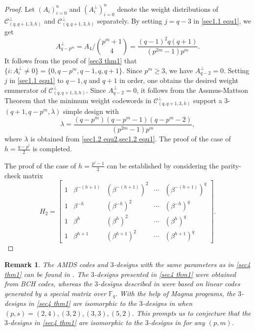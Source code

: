 \documentclass[sn-mathphys-num]{sn-jnl}%
\theoremstyle{thmstyleone}%
\theoremstyle{thmstyletwo}%
\newtheorem{remark}{Remark}%
\theoremstyle{thmstylethree}%
\begin{document}
\begin{proof}
	Let $(A_i)_{i=0}^n$ and $(A^\perp_i)_{i=0}^n$ denote the weight distributions of $\mathcal{C}^\perp_{(q,q+1,3,h)}$ and $\mathcal{C}^\perp_{(q,q+1,3,h)}$ separately. By setting $j=q-3$ in \cref{sec1.1 equ1}, we get
	\begin{equation*}
		A^\perp_{q-p^m}=A_4\bigg/\binom{p^m+1}{4}=\frac{(q-1)^2q(q+1)}{(p^{2m}-1)p^{m}}.
	\end{equation*}
	It follows from the proof of \cref{sec3 thm1} that $\{i : A^\perp_i \ne 0\}=\{0,q-p^m,q-1,q,q+1\}$. Since $p^m \ge 3$, we have $A^\perp_{q-2}=0$. Setting $j$ in \cref{sec1.1 equ1} to $q-1,q$ and $q+1$ in order, one obtains the desired weight enumerator of $\mathcal{C}^\perp_{(q,q+1,3,h)}$. Since $A^\perp_{q-2}=0$, it follows from the Assmus-Mattson Theorem that the minimum weight codewords in $\mathcal{C}^\perp_{(q,q+1,3,h)}$ support a $3$-$(q+1,q-p^m,\lambda)$ simple design with
	\begin{equation*}
		\lambda=\frac{(q-p^m)(q-p^m-1)(q-p^m-2)}{(p^{2m}-1)p^{m}},
	\end{equation*}
	where $\lambda$ is obtained from \cref{sec1.2 equ2,sec1.2 equ1}. The proof of the case of $h=\frac{q-p^i}{2}$ is completed.
	
	The proof of the case of $h=\frac{p^i-1}{2}$ can be established by considering the parity-check matrix
	\begin{equation}\label{sec4 thm1 equ2}
		\left.H_2=\left[\begin{array}{lllll}1&\beta^{-(h+1)}&(\beta^{-(h+1)})^2&\cdots&(\beta^{-(h+1)})^q\\1&\beta^{-h}&(\beta^{-h})^2&\cdots&(\beta^{-h})^q\\1&\beta^{h}&(\beta^{h})^2&\cdots&(\beta^{h})^q\\1&\beta^{h+1}&(\beta^{h+1})^2&\cdots&(\beta^{h+1})^q\end{array}\right.\right].
	\end{equation}
\end{proof}

\begin{remark}
	The AMDS codes and $3$-designs with the same parameters as in \cref{sec4 thm1} can be found in \cite[Theorem 5]{Xu2022InfiniteFamiliedDesigns}. The $3$-designs presented in \cref{sec4 thm1} were obtained from BCH codes, whereas the $3$-designs described in \cite{Xu2022InfiniteFamiliedDesigns} were based on linear codes generated by a special matrix over $\mathbb{F}_q$. With the help of Magma programs, the $3$-designs in \cref{sec4 thm1} are isomorphic to the $3$-designs in \cite[Theorem 5]{Xu2022InfiniteFamiliedDesigns} when $(p,s) = (2,4),(3,2),(3,3),(5,2)$. This prompts us to conjecture that the $3$-designs in \cref{sec4 thm1} are isomorphic to the $3$-designs in \cite[Theorem 5]{Xu2022InfiniteFamiliedDesigns} for any $(p,m)$.
\end{remark}
\end{document}
